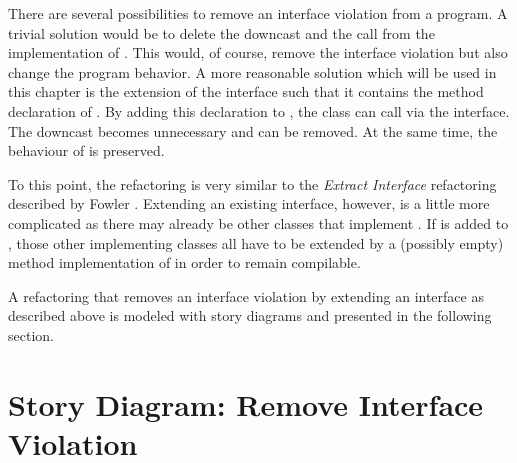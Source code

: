 There are several possibilities to remove an interface violation from a program. A trivial solution would be to delete the downcast and the call from the implementation of . This would, of course, remove the interface violation but also change the program behavior. A more reasonable solution which will be used in this chapter is the extension of the interface  such that it contains the method declaration of . By adding this declaration to , the class  can call  via the interface. The downcast becomes unnecessary and can be removed. At the same time, the behaviour of  is preserved.

To this point, the refactoring is very similar to the \emph{Extract Interface} refactoring described by Fowler \cite{Fow99}. Extending an existing interface, however, is a little more complicated as there may already be other classes that implement . If  is added to , those other implementing classes all have to be extended by a (possibly empty) method implementation of  in order to remain compilable.

A refactoring that removes an interface violation by extending an interface as described above is modeled with story diagrams and presented in the following section.

\section{Story Diagram: Remove Interface Violation}

